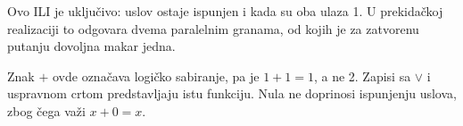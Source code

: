 
Ovo ILI je uključivo: uslov ostaje ispunjen i kada su oba ulaza 1. U prekidačkoj realizaciji to odgovara dvema paralelnim granama, od kojih je za zatvorenu putanju dovoljna makar jedna.

Znak \(+\) ovde označava logičko sabiranje, pa je \(1+1=1\), a ne 2. Zapisi sa \(\lor\) i uspravnom crtom predstavljaju istu funkciju. Nula ne doprinosi ispunjenju uslova, zbog čega važi \(x+0=x\).
